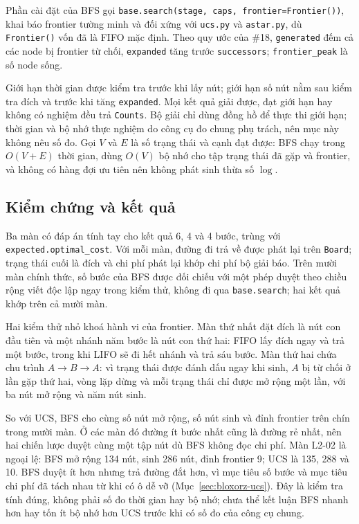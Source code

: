 Phần cài đặt của BFS gọi \texttt{base.search(stage, caps, frontier=Frontier())}, khai
báo frontier tường minh và đối xứng với \texttt{ucs.py} và \texttt{astar.py}, dù
\texttt{Frontier()} vốn đã là FIFO mặc định. Theo quy ước của \#18, \texttt{generated}
đếm cả các node bị frontier từ chối, \texttt{expanded} tăng trước \texttt{successors};
\texttt{frontier\_peak} là số node sống.

Giới hạn thời gian được kiểm tra trước khi lấy nút; giới hạn số nút nằm sau kiểm tra
đích và trước khi tăng \texttt{expanded}. Mọi kết quả giải được, đạt giới hạn hay không
có nghiệm đều trả \texttt{Counts}. Bộ giải chỉ dùng đồng hồ để thực thi giới hạn; thời
gian và bộ nhớ thực nghiệm do công cụ đo chung phụ trách, nên mục này không nêu số đo.
Gọi $V$ và $E$ là số trạng thái và cạnh đạt được: BFS chạy trong $O(V+E)$ thời gian,
dùng $O(V)$ bộ nhớ cho tập trạng thái đã gặp và frontier, và không có hàng đợi ưu tiên
nên không phát sinh thừa số $\log$.

\subsection{Kiểm chứng và kết quả}

Ba màn có đáp án tính tay cho kết quả 6, 4 và 4 bước, trùng với
\texttt{expected.optimal\_cost}. Với mỗi màn, đường đi trả về được phát lại trên
\texttt{Board}; trạng thái cuối là đích và chi phí phát lại khớp chi phí bộ giải báo.
Trên mười màn chính thức, số bước của BFS được đối chiếu với một phép duyệt theo chiều
rộng viết độc lập ngay trong kiểm thử, không đi qua \texttt{base.search}; hai kết quả
khớp trên cả mười màn.

Hai kiểm thử nhỏ khoá hành vi của frontier. Màn thứ nhất đặt đích là nút con đầu tiên và
một nhánh năm bước là nút con thứ hai: FIFO lấy đích ngay và trả một bước, trong khi
LIFO sẽ đi hết nhánh và trả sáu bước. Màn thứ hai chứa chu trình $A\to B\to A$: vì trạng
thái được đánh dấu ngay khi sinh, $A$ bị từ chối ở lần gặp thứ hai, vòng lặp dừng và mỗi
trạng thái chỉ được mở rộng một lần, với ba nút mở rộng và năm nút sinh.

So với UCS, BFS cho cùng số nút mở rộng, số nút sinh và đỉnh frontier trên chín trong
mười màn. Ở các màn đó đường ít bước nhất cũng là đường rẻ nhất, nên hai chiến lược duyệt
cùng một tập nút dù BFS không đọc chi phí. Màn L2-02 là ngoại lệ: BFS mở rộng 134 nút,
sinh 286 nút, đỉnh frontier 9; UCS là 135, 288 và 10. BFS duyệt ít hơn nhưng trả đường
đắt hơn, vì mục tiêu số bước và mục tiêu chi phí đã tách nhau từ khi có ô dễ vỡ
(Mục~\ref{sec:bloxorz-ucs}). Đây là kiểm tra tính đúng, không phải số đo thời gian hay bộ
nhớ; chưa thể kết luận BFS nhanh hơn hay tốn ít bộ nhớ hơn UCS trước khi có số đo của
công cụ chung.
